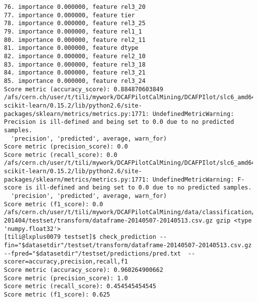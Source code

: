 \begin{verbatim}
76. importance 0.000000, feature rel3_20
77. importance 0.000000, feature tier
78. importance 0.000000, feature rel3_25
79. importance 0.000000, feature rel1_1
80. importance 0.000000, feature rel2_11
81. importance 0.000000, feature dtype
82. importance 0.000000, feature rel2_10
83. importance 0.000000, feature rel3_18
84. importance 0.000000, feature rel3_21
85. importance 0.000000, feature rel3_24
Score metric (accuracy_score): 0.884870603849
/afs/cern.ch/user/t/tili/mywork/DCAFPilotCalMining/DCAFPIlot/slc6_amd64_gcc481/external/py2-scikit-learn/0.15.2/lib/python2.6/site-packages/sklearn/metrics/metrics.py:1771: UndefinedMetricWarning: Precision is ill-defined and being set to 0.0 due to no predicted samples.
  'precision', 'predicted', average, warn_for)
Score metric (precision_score): 0.0
Score metric (recall_score): 0.0
/afs/cern.ch/user/t/tili/mywork/DCAFPilotCalMining/DCAFPIlot/slc6_amd64_gcc481/external/py2-scikit-learn/0.15.2/lib/python2.6/site-packages/sklearn/metrics/metrics.py:1771: UndefinedMetricWarning: F-score is ill-defined and being set to 0.0 due to no predicted samples.
  'precision', 'predicted', average, warn_for)
Score metric (f1_score): 0.0
/afs/cern.ch/user/t/tili/mywork/DCAFPilotCalMining/data/classification/tier2/merge_conf_tier2_201305-201404/testset/transform/dataframe-20140507-20140513.csv.gz gzip <type 'numpy.float32'>
[tili@lxplus0079 testset]$ check_prediction --fin="$datasetdir"/testset/transform/dataframe-20140507-20140513.csv.gz  --fpred="$datasetdir"/testset/predictions/pred.txt  --scorer=accuracy,precision,recall,f1
Score metric (accuracy_score): 0.960264900662
Score metric (precision_score): 1.0
Score metric (recall_score): 0.454545454545
Score metric (f1_score): 0.625
\end{verbatim}
